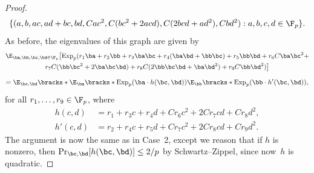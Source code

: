 \documentclass[11pt]{article}
\newcommand{\CC}[2]{\mathcal{C}\mathcal{C}(#1;#2)}
\newcommand{\Exp}{{\mathrm{Exp}}}
\begin{document}
\begin{proof}
    \begin{align*}
        \{(a,b,ac,ad+bc,bd,Cac^2,C(bc^2+2acd),C(2bcd+ad^2),Cbd^2)
        : a,b,c,d \in \F_p\}.
        \end{align*}
        As before, the eigenvalues of this graph are given by
        \begin{multline*}
         \E_{\ba,\bb,\bc,\bd \in \F_p}\bigl[\Exp_p( r_1\ba+r_2\bb+r_3\ba\bc+r_4(\ba\bd+\bb\bc) + r_5\bb\bd +r_6C\ba\bc^2+ \\
        r_7C(\bb\bc^2+2\ba\bc\bd)+r_8C(2\bb\bc\bd+\ba\bd^2)+r_9C\bb\bd^2)\bigr]
        \end{multline*}
        \begin{equation} 
            \mathrel{=}  \E_{\bc,\bd}\bracks*{
            \E_{\ba}\bracks*{\Exp_p(\ba \cdot h(\bc,\bd))}
            \E_{\bb}\bracks*{\Exp_p(\bb \cdot h'(\bc,\bd))}}, \label{sum2}
        \end{equation}
        for all $r_1, \ldots, r_9 \in \F_p$, where
        \begin{align*}
        h(c,d) &= r_1+r_3c+r_4d+Cr_6c^2+2Cr_7cd+Cr_8d^2,\\
        h'(c,d) &= r_2+r_4c+r_5d+Cr_7c^2+2Cr_8cd+Cr_9d^2.
        \end{align*}
        The argument is now the same as in Case~2, except we reason that if $h$ is nonzero, then $\Pr_{\bc,\bd}[h(\bc,\bd)] \leq 2/p$ by Schwartz--Zippel, since now~$h$ is quadratic.
    \end{proof}



\end{document}
